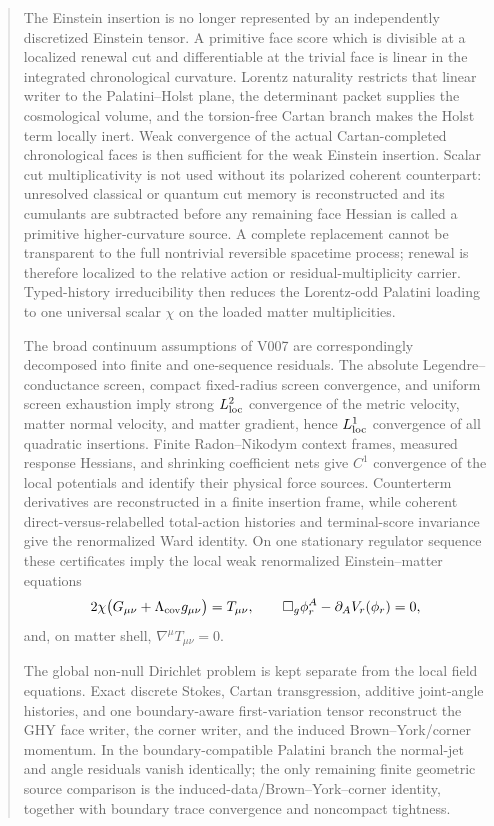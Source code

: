 \documentclass[11pt]{article}
\theoremstyle{definition}
\theoremstyle{remark}
\begin{document}
\begin{abstract}
The Einstein insertion is no longer represented by an independently
discretized Einstein tensor.  A primitive face score which is divisible at a
localized renewal cut and differentiable at the trivial face is linear in the
integrated chronological curvature.  Lorentz naturality restricts that
linear writer to the Palatini--Holst plane, the determinant packet supplies
the cosmological volume, and the torsion-free Cartan branch makes the Holst
term locally inert.  Weak convergence of the actual Cartan-completed
chronological faces is then sufficient for the weak Einstein insertion.
Scalar cut multiplicativity is not used without its polarized coherent
counterpart: unresolved classical or quantum cut memory is reconstructed and
its cumulants are subtracted before any remaining face Hessian is called a
primitive higher-curvature source.  A complete replacement cannot be
transparent to the full nontrivial reversible spacetime process; renewal is
therefore localized to the relative action or residual-multiplicity carrier.
Typed-history irreducibility then reduces the Lorentz-odd Palatini loading to
one universal scalar \(\chi\) on the loaded matter multiplicities.

The broad continuum assumptions of V007 are correspondingly decomposed into
finite and one-sequence residuals.  The absolute Legendre--conductance screen,
compact fixed-radius screen convergence, and uniform screen exhaustion imply
strong \(L^2_{\rm loc}\) convergence of the metric velocity, matter normal
velocity, and matter gradient, hence \(L^1_{\rm loc}\) convergence of all
quadratic insertions.  Finite Radon--Nikodym context frames, measured response
Hessians, and shrinking coefficient nets give \(C^1\) convergence of the
local potentials and identify their physical force sources.  Counterterm
derivatives are reconstructed in a finite insertion frame, while coherent
direct-versus-relabelled total-action histories and terminal-score invariance
give the renormalized Ward identity.  On one stationary regulator sequence
these certificates imply the local weak renormalized Einstein--matter
equations
\[
 2\chi\bigl(G_{\mu\nu}+\Lambda_{\rm cov}g_{\mu\nu}\bigr)=T_{\mu\nu},
 \qquad
 \Box_g\phi_r^A-\partial_AV_r(\phi_r)=0,
\]
and, on matter shell, \(\nabla^\mu T_{\mu\nu}=0\).

The global non-null Dirichlet problem is kept separate from the local field
equations.  Exact discrete Stokes, Cartan transgression, additive joint-angle
histories, and one boundary-aware first-variation tensor reconstruct the GHY
face writer, the corner writer, and the induced Brown--York/corner momentum.
In the boundary-compatible Palatini branch the normal-jet and angle residuals
vanish identically; the only remaining finite geometric source comparison is
the induced-data/Brown--York--corner identity, together with boundary trace
convergence and noncompact tightness.


\end{abstract}
\end{document}
